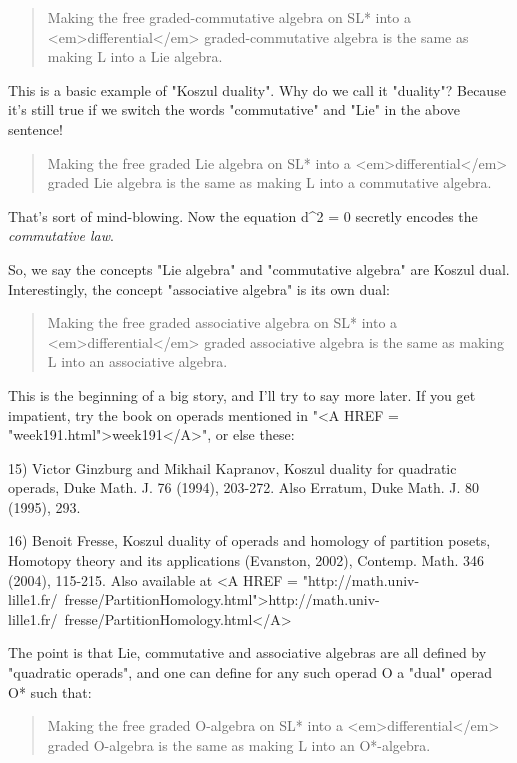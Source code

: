 \begin{quote}
 Making the free graded-commutative algebra on SL* into a <em>differential</em>
 graded-commutative algebra is the same as making L into a Lie algebra.  
\end{quote}
    

This is a basic example of "Koszul duality".  Why do we call it 
"duality"?  Because it's still true if we switch the words 
"commutative" and "Lie" in the above sentence!

\begin{quote}
 Making the free graded Lie algebra on SL* into a <em>differential</em>
 graded Lie algebra is the same as making L into a commutative algebra.
\end{quote}
    

That's sort of mind-blowing.  Now the equation d^{2} = 0 secretly 
encodes the \emph{commutative law}.

So, we say the concepts "Lie algebra" 
and "commutative algebra" are
Koszul dual.  Interestingly, the concept "associative 
algebra" is its own dual:

\begin{quote}
 Making the free graded associative algebra on SL* into a <em>differential</em>
 graded associative algebra is the same as making L into an associative
 algebra.
\end{quote}
    

This is the beginning of a big story, and I'll try to say more later.
If you get impatient, try the book on operads mentioned in "<A HREF = "week191.html">week191</A>",
or else these:

15) Victor Ginzburg and Mikhail Kapranov, Koszul duality for quadratic
operads, Duke Math. J. 76 (1994), 203-272.  Also Erratum, Duke Math. 
J. 80 (1995), 293.

16) Benoit Fresse, Koszul duality of operads and homology of partition 
posets, Homotopy theory and its applications (Evanston, 2002), 
Contemp. Math. 346 (2004), 115-215.  Also available at 
<A HREF = "http://math.univ-lille1.fr/~fresse/PartitionHomology.html">http://math.univ-lille1.fr/~fresse/PartitionHomology.html</A>

The point is that Lie, commutative and associative algebras are all
defined by "quadratic operads", and one can define for any such 
operad O a "dual" operad O* such that:

\begin{quote}
 Making the free graded O-algebra on SL* into a <em>differential</em>
 graded O-algebra is the same as making L into an O*-algebra.
\end{quote}
    

